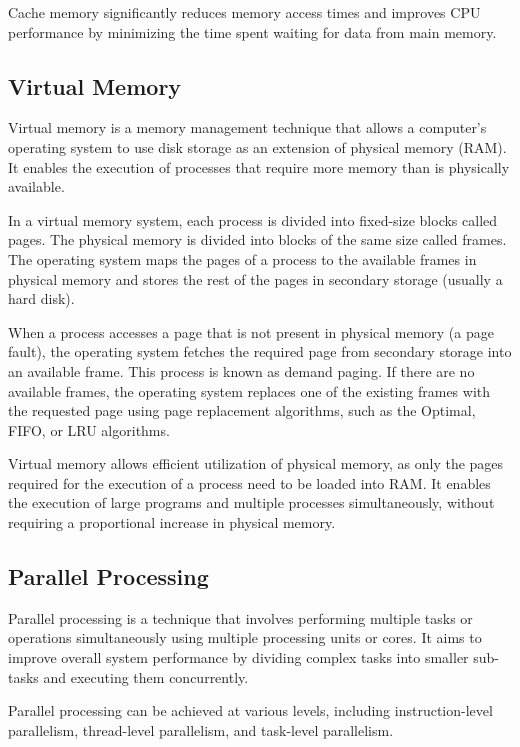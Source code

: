 \documentclass{article}
\begin{document}
Cache memory significantly reduces memory access times and improves CPU performance by minimizing the time spent waiting for data from main memory.

\subsection{Virtual Memory}

Virtual memory is a memory management technique that allows a computer's operating system to use disk storage as an extension of physical memory (RAM). It enables the execution of processes that require more memory than is physically available.

In a virtual memory system, each process is divided into fixed-size blocks called pages. The physical memory is divided into blocks of the same size called frames. The operating system maps the pages of a process to the available frames in physical memory and stores the rest of the pages in secondary storage (usually a hard disk).

When a process accesses a page that is not present in physical memory (a page fault), the operating system fetches the required page from secondary storage into an available frame. This process is known as demand paging. If there are no available frames, the operating system replaces one of the existing frames with the requested page using page replacement algorithms, such as the Optimal, FIFO, or LRU algorithms.

Virtual memory allows efficient utilization of physical memory, as only the pages required for the execution of a process need to be loaded into RAM. It enables the execution of large programs and multiple processes simultaneously, without requiring a proportional increase in physical memory.

\subsection{Parallel Processing}

Parallel processing is a technique that involves performing multiple tasks or operations simultaneously using multiple processing units or cores. It aims to improve overall system performance by dividing complex tasks into smaller sub-tasks and executing them concurrently.

Parallel processing can be achieved at various levels, including instruction-level parallelism, thread-level parallelism, and task-level parallelism.
\end{document}
